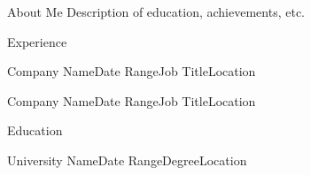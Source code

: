 \documentclass{resume}
\begin{document}
\begin{rSection}{About Me}
  Description of education, achievements, etc.
\end{rSection}

\begin{rSection}{Experience}

\begin{rSubsection}{Company Name}{Date Range}{Job Title}{Location}
\end{rSubsection}

\begin{rSubsection}{Company Name}{Date Range}{Job Title}{Location}
\end{rSubsection}

\end{rSection}

\begin{rSection}{Education}
  \begin{rSubsection}{University Name}{Date Range}{Degree}{Location}
  \end{rSubsection}
\end{rSection}
\end{document}
